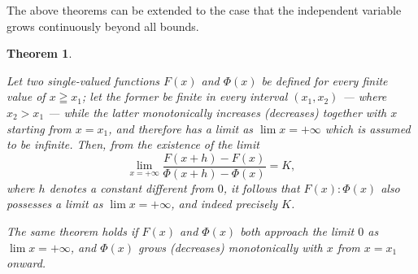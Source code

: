 \documentclass[a4paper]{amsbook}
\newtheorem*{theorem*}{Theorem}
\begin{document}
The above theorems can be extended to the case that the independent variable grows continuously beyond all bounds.

\begin{theorem*}
  \leavevmode
  \begin{enumerate}[{label=\enumparen[1em]{\arabic*\upstar}}]
  \item \label{thm:1star} Let two single-valued functions \(F(x)\) and \(\Phi(x)\) be defined for every finite value of \(x \geqq x_1\); let the former be finite in every interval \((x_1, x_2)\) --- where \(x_2 > x_1\) --- while the latter monotonically increases (decreases) together with \(x\) starting from \(x = x_1\), and therefore has a limit as \(\lim x = +\infty\) which is assumed to be infinite.  Then, from the existence of the limit
    \begin{equation*}
      \lim_{x=+\infty} \frac{F(x+h) - F(x)}{\Phi(x+h) - \Phi(x)} = K,
    \end{equation*}
    where \(h\) denotes a constant different from \(0\), it follows that \(F(x):\Phi(x)\) also possesses a limit as \(\lim x = +\infty\), and indeed precisely \(K\).

  \item The same theorem holds if \(F(x)\) and \(\Phi(x)\) both approach the limit \(0\) as \(\lim x = +\infty\), and \(\Phi(x)\) grows (decreases) monotonically with \(x\) from \(x = x_1\) onward.
  \end{enumerate}
\end{theorem*}
\end{document}
